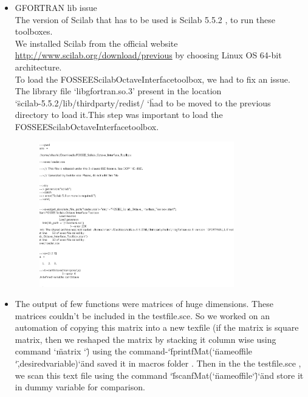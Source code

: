 \documentclass[12pt,a4paper]{report}
\begin{document}
\begin{itemize}
\item GFORTRAN lib issue\\
The version of Scilab that has to be used is Scilab 5.5.2 , to run these toolboxes.\\
We installed Scilab from the official website \url{http://www.scilab.org/download/previous} by choosing Linux OS 64-bit architecture. \\
To load the FOSSEE\textunderscore Scilab\textunderscore Octave\textunderscore Interface\textunderscore toolbox, we had to fix an issue. \\
The library file ‘libgfortran.so.3’ present in the location  \\ \char`\"scilab-5.5.2/lib/thirdparty/redist/  \char`\" 
 had to be moved to the previous directory to load it.This step was important to load the                       FOSSEE\textunderscore Scilab\textunderscore Octave\textunderscore Interface\textunderscore toolbox.

\begin{figure}[H]
\centering
\includegraphics[width = 0.8\textwidth]{gfortran.png}
\end{figure}

\item The output of few functions were matrices of huge dimensions. These matrices couldn’t be included in the testfile.sce. So we worked on an automation of copying this matrix into a new texfile (if the matrix is square matrix, then we reshaped the matrix by stacking it column wise using command \char`\"matrix \char`\"  ) using the command-\char`\"fprintfMat(\char`\"name\textunderscore of\textunderscore file \char`\" ,desired\textunderscore variable)\char`\" and saved it in macros folder . Then in the the testfile.sce , we scan this text file using the command \char`\" fscanfMat(\char`\"name\textunderscore of\textunderscore file\char`\")\char`\"and store it in dummy variable for comparison.\\


\end{itemize}
\end{document}

